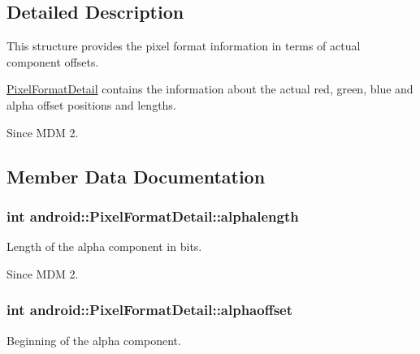 

\subsection{\-Detailed \-Description}
\-This structure provides the pixel format information in terms of actual component offsets. 

\hyperlink{structandroid_1_1PixelFormatDetail}{\-Pixel\-Format\-Detail} contains the information about the actual red, green, blue and alpha offset positions and lengths.

\begin{DoxySince}{\-Since}
\-M\-D\-M 2. 
\end{DoxySince}


\subsection{\-Member \-Data \-Documentation}
\hypertarget{structandroid_1_1PixelFormatDetail_a4bb2ec069b84b7cf3abfd084bc23f483}{
\subsubsection[{alphalength}]{\setlength{\rightskip}{0pt plus 5cm}int {\bf android\-::\-Pixel\-Format\-Detail\-::alphalength}}}\label{structandroid_1_1PixelFormatDetail_a4bb2ec069b84b7cf3abfd084bc23f483}


\-Length of the alpha component in bits. 

\begin{DoxySince}{\-Since}
\-M\-D\-M 2. 
\end{DoxySince}
\hypertarget{structandroid_1_1PixelFormatDetail_acd22e5fc60422d9eb58d6ca78a781916}{
\subsubsection[{alphaoffset}]{\setlength{\rightskip}{0pt plus 5cm}int {\bf android\-::\-Pixel\-Format\-Detail\-::alphaoffset}}}\label{structandroid_1_1PixelFormatDetail_acd22e5fc60422d9eb58d6ca78a781916}


\-Beginning of the alpha component. 

